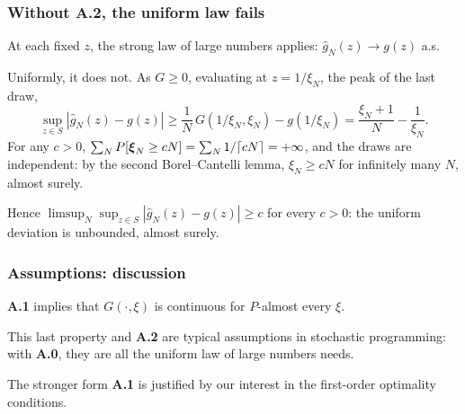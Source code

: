 \documentclass[aspectratio=169]{beamer}
\begin{document}
\begin{frame}
\frametitle{Without \textbf{A.2}, the uniform law fails}

At each fixed $z$, the strong law of large numbers applies: $\hat{g}_N(z) \rightarrow g(z)$ a.s.

\mbox{}

Uniformly, it does not. As $G \geq 0$, evaluating at $z = 1/\xi_N$, the peak of the last draw,
\[
\sup_{z \in S} \left| \hat{g}_N(z) - g(z) \right| \geq \frac{1}{N}\, G(1/\xi_N, \xi_N) - g(1/\xi_N) = \frac{\xi_N + 1}{N} - \frac{1}{\xi_N}.
\]
For any $c > 0$, $\sum_N P[{\boldsymbol{\xi}}_N \geq cN] = \sum_N 1/\lceil cN \rceil = +\infty$, and the draws are independent: by the second Borel--Cantelli lemma, $\xi_N \geq cN$ for infinitely many $N$, almost surely.

\mbox{}

Hence $\limsup_N \sup_{z \in S} |\hat{g}_N(z) - g(z)| \geq c$ for every $c > 0$: the uniform deviation is unbounded, almost surely.

\end{frame}

\begin{frame}
\frametitle{Assumptions: discussion}

\textbf{A.1} implies that $G(\cdot, \xi)$ is continuous for $P$-almost every $\xi$.

\mbox{}

This last property and \textbf{A.2} are typical assumptions in stochastic programming: with \textbf{A.0}, they are all the uniform law of large numbers needs.

\mbox{}

The stronger form \textbf{A.1} is justified by our interest in the first-order optimality conditions.%

\end{frame}
\end{document}
